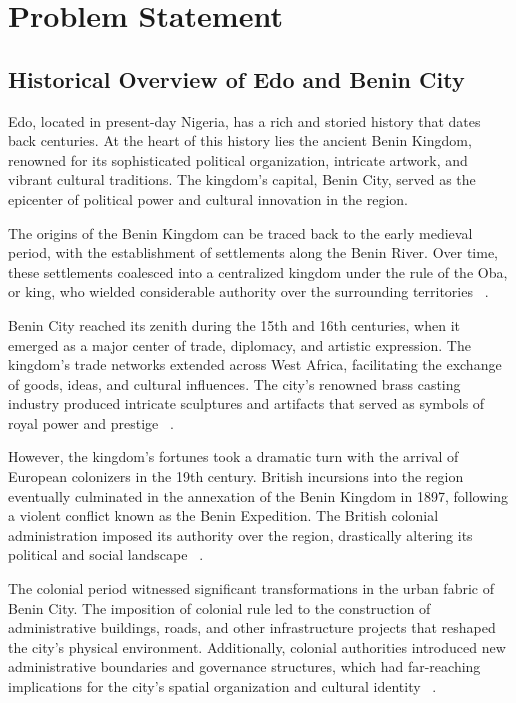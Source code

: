 \chapter{Problem Statement}

\section{Historical Overview of Edo and Benin City}
Edo, located in present-day Nigeria, has a rich and storied history that dates back centuries. At the heart of this history lies the ancient Benin Kingdom, renowned for its sophisticated political organization, intricate artwork, and vibrant cultural traditions. The kingdom's capital, Benin City, served as the epicenter of political power and cultural innovation in the region.

The origins of the Benin Kingdom can be traced back to the early medieval period, with the establishment of settlements along the Benin River. Over time, these settlements coalesced into a centralized kingdom under the rule of the Oba, or king, who wielded considerable authority over the surrounding territories ~\cite{egharevba1968short}.

Benin City reached its zenith during the 15th and 16th centuries, when it emerged as a major center of trade, diplomacy, and artistic expression. The kingdom's trade networks extended across West Africa, facilitating the exchange of goods, ideas, and cultural influences. The city's renowned brass casting industry produced intricate sculptures and artifacts that served as symbols of royal power and prestige ~\cite{egharevba1968short}.

However, the kingdom's fortunes took a dramatic turn with the arrival of European colonizers in the 19th century. British incursions into the region eventually culminated in the annexation of the Benin Kingdom in 1897, following a violent conflict known as the Benin Expedition. The British colonial administration imposed its authority over the region, drastically altering its political and social landscape ~\cite{egharevba1968short}.

The colonial period witnessed significant transformations in the urban fabric of Benin City. The imposition of colonial rule led to the construction of administrative buildings, roads, and other infrastructure projects that reshaped the city's physical environment. Additionally, colonial authorities introduced new administrative boundaries and governance structures, which had far-reaching implications for the city's spatial organization and cultural identity ~\cite{falola2006works}.

